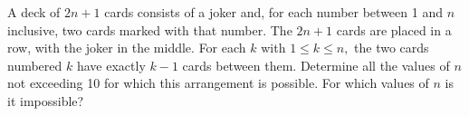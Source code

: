 A deck of $ 2n+1$ cards consists of a joker and, for each number between 1 and $ n$ inclusive, two cards marked with that number. The $ 2n+1$ cards are placed in a row, with the joker in the middle. For each $ k$ with $ 1 \leq k \leq n,$ the two cards numbered $ k$ have exactly $ k-1$ cards between them. Determine all the values of $ n$ not exceeding 10 for which this arrangement is possible. For which values of $ n$ is it impossible?